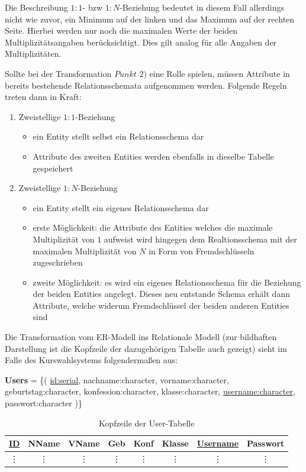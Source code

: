 Die Beschreibung $1:1$- bzw $1:N$-Beziehung bedeutet in diesem Fall allerdings nicht wie zuvor, ein Minimum auf der linken und das Maximum auf der rechten Seite. 
Hierbei werden nur noch die maximalen Werte der beiden Multiplizitätsangaben berücksichtigt. Dies gilt analog für alle Angaben der Multiplizitäten.

Sollte bei der Transformation $Punkt$ $2)$ eine Rolle spielen, müssen Attribute in bereits bestehende Relationsschemata aufgenommen werden. Folgende Regeln treten dann in Kraft:
\begin{enumerate}
 \item Zweistellige $1:1$-Beziehung
 \begin{itemize}
  \item ein Entity stellt selbst ein Relationsschema dar
  \item Attribute des zweiten Entities werden ebenfalls in dieselbe Tabelle gespeichert
 \end{itemize}
 \item Zweistellige $1:N$-Beziehung
 \begin{itemize}
  \item ein Entity stellt ein eigenes Relationsschema dar
  \item erste Möglichkeit: die Attribute des Entities welches die maximale Multiplizität von $1$ aufweist wird hingegen dem Realtionsschema mit der maximalen Multiplizität von $N$ in Form von Fremdschlüsseln zugeschrieben
  \item zweite Möglichkeit: es wird ein eigenes Relationsschema für die Beziehung der beiden Entities angelegt. Dieses neu entstande Schema erhält dann Attribute, welche widerum Fremdschlüssel der beiden anderen Entities sind
 \end{itemize}
\end{enumerate}

Die Transformation vom \ac{ER-Modell} ins Relationale Modell (zur bildhaften Darstellung ist die Kopfzeile der dazugehörigen Tabelle auch gezeigt) sieht im Falle des Kurswahlsystems folgendermaßen aus:

\textbf{Users} = \{( \underline{id:serial}, nachname:character, vorname:character, geburtstag:character, konfession:character, klasse:character, \underline{username:character}, passwort:character )\}

\begin{table}[H]
\begin{center}
	\begin{tabular}{|c|c|c|c|c|c|c|c|}\hline
		\textbf{\underline{ID}} & \textbf{NName} & \textbf{VName} & \textbf{Geb} & \textbf{Konf} & \textbf{Klasse} & \textbf{\underline{Username}} & \textbf{Passwort} \\ \hline
		\vdots & \vdots & \vdots & \vdots & \vdots & \vdots & \vdots & \vdots \\
	\end{tabular}
	\caption{Kopfzeile der User-Tabelle}
\end{center}
\end{table}

